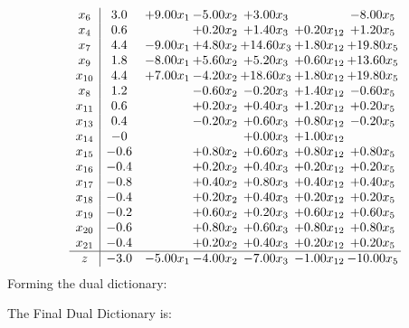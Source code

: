\documentclass[8pt]{article}
\begin{document}
\[\begin{array}{c| c c@{\hskip 2pt} c@{\hskip 2pt} c@{\hskip 2pt} c@{\hskip 2pt} c@{\hskip 2pt} }
 x_{6}   &  3.0 & +  9.00 x_{1} & -5.00 x_{2} & +  3.00 x_{3} &   & -8.00 x_{5}\\
 x_{4}   &  0.6  &   & +  0.20 x_{2} & +  1.40 x_{3} & +  0.20 x_{12} & +  1.20 x_{5}\\
 x_{7}   &  4.4 & -9.00 x_{1} & +  4.80 x_{2} & + 14.60 x_{3} & +  1.80 x_{12} & + 19.80 x_{5}\\
 x_{9}   &  1.8 & -8.00 x_{1} & +  5.60 x_{2} & +  5.20 x_{3} & +  0.60 x_{12} & + 13.60 x_{5}\\
 x_{10}   &  4.4 & +  7.00 x_{1} & -4.20 x_{2} & + 18.60 x_{3} & +  1.80 x_{12} & + 19.80 x_{5}\\
 x_{8}   &  1.2  &   & -0.60 x_{2} & -0.20 x_{3} & +  1.40 x_{12} & -0.60 x_{5}\\
 x_{11}   &  0.6  &   & +  0.20 x_{2} & +  0.40 x_{3} & +  1.20 x_{12} & +  0.20 x_{5}\\
 x_{13}   &  0.4  &   & -0.20 x_{2} & +  0.60 x_{3} & +  0.80 x_{12} & -0.20 x_{5}\\
 x_{14}   &  -0  &    &   & +  0.00 x_{3} & +  1.00 x_{12} &   \\
 x_{15}   &  -0.6  &   & +  0.80 x_{2} & +  0.60 x_{3} & +  0.80 x_{12} & +  0.80 x_{5}\\
 x_{16}   &  -0.4  &   & +  0.20 x_{2} & +  0.40 x_{3} & +  0.20 x_{12} & +  0.20 x_{5}\\
 x_{17}   &  -0.8  &   & +  0.40 x_{2} & +  0.80 x_{3} & +  0.40 x_{12} & +  0.40 x_{5}\\
 x_{18}   &  -0.4  &   & +  0.20 x_{2} & +  0.40 x_{3} & +  0.20 x_{12} & +  0.20 x_{5}\\
 x_{19}   &  -0.2  &   & +  0.60 x_{2} & +  0.20 x_{3} & +  0.60 x_{12} & +  0.60 x_{5}\\
 x_{20}   &  -0.6  &   & +  0.80 x_{2} & +  0.60 x_{3} & +  0.80 x_{12} & +  0.80 x_{5}\\
 x_{21}   &  -0.4  &   & +  0.20 x_{2} & +  0.40 x_{3} & +  0.20 x_{12} & +  0.20 x_{5}\\
\hline
z    &  -3.0 & -5.00 x_{1} & -4.00 x_{2} & -7.00 x_{3} & -1.00 x_{12} & -10.00 x_{5}\\
\end{array}\]
Forming the dual dictionary:

The Final Dual Dictionary is: 
\end{document}
